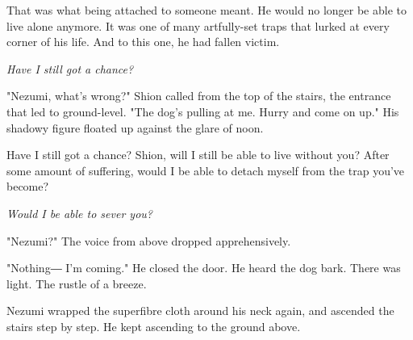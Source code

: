 That was what being attached to someone meant. He would no longer be
able to live alone anymore. It was one of many artfully-set traps that
lurked at every corner of his life. And to this one, he had fallen
victim.

\emph{Have I still got a chance?}

"Nezumi, what's wrong?" Shion called from the top of the stairs, the
entrance that led to ground-level. "The dog's pulling at me. Hurry and
come on up." His shadowy figure floated up against the glare of noon.

Have I still got a chance? Shion, will I still be able to live without
you? After some amount of suffering, would I be able to detach myself
from the trap you've become?

\emph{Would I be able to sever you?}

"Nezumi?" The voice from above dropped apprehensively.

"Nothing― I'm coming." He closed the door. He heard the dog bark. There
was light. The rustle of a breeze.

Nezumi wrapped the superfibre cloth around his neck again, and ascended
the stairs step by step. He kept ascending to the ground above.